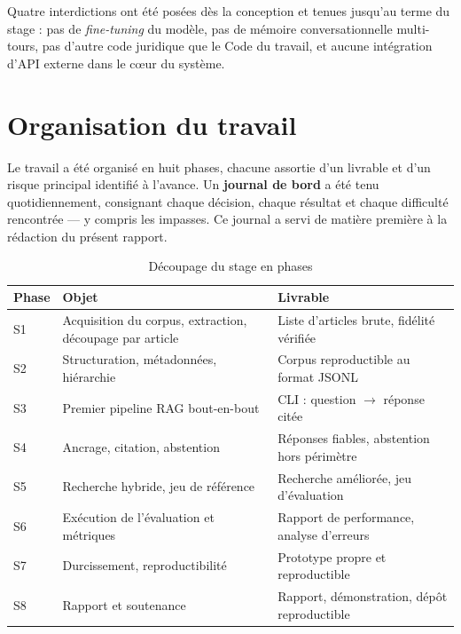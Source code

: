 Quatre interdictions ont été posées dès la conception et tenues jusqu'au terme du stage : pas de
\textit{fine-tuning} du modèle, pas de mémoire conversationnelle multi-tours, pas d'autre code
juridique que le Code du travail, et aucune intégration d'API externe dans le cœur du système.

\section{Organisation du travail}

Le travail a été organisé en huit phases, chacune assortie d'un livrable et d'un risque principal
identifié à l'avance. Un \textbf{journal de bord} a été tenu quotidiennement, consignant chaque
décision, chaque résultat et chaque difficulté rencontrée --- y compris les impasses. Ce journal
a servi de matière première à la rédaction du présent rapport.

\begin{table}[H]
    \centering
    \begin{tabular}{|m{1.2cm}|m{6.5cm}|m{6.5cm}|}
        \hline
        \textbf{Phase} & \textbf{Objet} & \textbf{Livrable} \\
        \hline
        S1 & Acquisition du corpus, extraction, découpage par article & Liste d'articles brute, fidélité vérifiée \\
        \hline
        S2 & Structuration, métadonnées, hiérarchie & Corpus reproductible au format JSONL \\
        \hline
        S3 & Premier pipeline RAG bout-en-bout & CLI : question $\rightarrow$ réponse citée \\
        \hline
        S4 & Ancrage, citation, abstention & Réponses fiables, abstention hors périmètre \\
        \hline
        S5 & Recherche hybride, jeu de référence & Recherche améliorée, jeu d'évaluation \\
        \hline
        S6 & Exécution de l'évaluation et métriques & Rapport de performance, analyse d'erreurs \\
        \hline
        S7 & Durcissement, reproductibilité & Prototype propre et reproductible \\
        \hline
        S8 & Rapport et soutenance & Rapport, démonstration, dépôt reproductible \\
        \hline
    \end{tabular}
    \caption{Découpage du stage en phases}
    \label{tab:phases}
\end{table}

